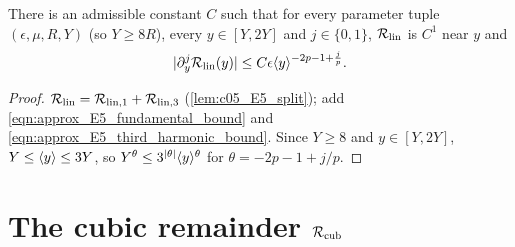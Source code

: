 \begin{proposition}
  \label{prop:approx_E5_linear}
  There is an admissible constant $C$ such that for every parameter tuple $(\epsilon,\mu,R,Y)$ (so $Y\ge8R$), every
  $y\in[Y,2Y]$ and $j\in\{0,1\}$, $\mathcal{R}_{\textup{lin}}$ is $C^1$ near $y$ and
  \begin{equation}\label{eqn:approx_E5_linear_remainder}
    |\partial_y^j\mathcal{R}_{\textup{lin}}(y)|\le C\epsilon\langle y \rangle^{-2p-1+\frac jp}.
  \end{equation}
\end{proposition}
\begin{proof}
  $\mathcal{R}_{\textup{lin}}=\mathcal{R}_{\textup{lin},1}+\mathcal{R}_{\textup{lin},3}$ (\cref{lem:c05_E5_split}); add
  \eqref{eqn:approx_E5_fundamental_bound} and \eqref{eqn:approx_E5_third_harmonic_bound}. Since $Y\ge8$ and $y\in[Y,2Y]$,
  $Y\le\langle y \rangle\le3Y$, so $Y^{\theta}\le3^{|\theta|}\langle y \rangle^\theta$ for $\theta=-2p-1+j/p$.
\end{proof}

\section{The cubic remainder \texorpdfstring{$\mathcal{R}_{\textup{cub}}$}{R\_cub}}

